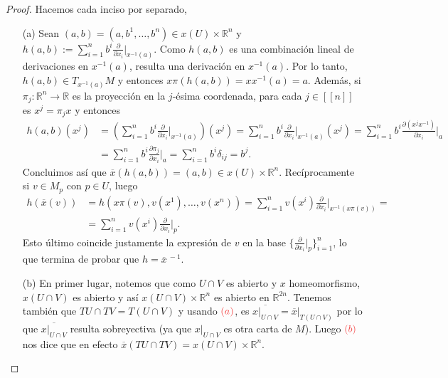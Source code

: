\documentclass[11pt]{article}
\newcommand{\R}{\mathbb{R}}
\newcommand{\nat}[1]{[\![#1]\!]}
\newcommand{\paint}[2]{\color{#1}{#2}}
\newcommand{\ol}{\overline}
\newcommand{\hook}[3]{\frac{\partial}{\partial x_{#1}}\Big\rvert_{#2}^{#3}}
\begin{document}
\begin{proof} Hacemos cada inciso por separado,
\begin{itemize}
\item[(a)] Sean $(a,b) = (a, b^1, \dots, b^n) \in x(U) \times \R^n$ y $h(a,b) := \sum_{i=1}^nb^i \frac{\partial}{\partial x_i}|_{x^{-1}(a)}$. Como $h(a,b)$ es una combinaci\'on lineal de derivaciones en $x^{-1}(a)$, resulta una derivaci\'on en $x^{-1}(a)$. Por lo tanto, $h(a,b) \in T_{x^{-1}(a)}M$ y entonces $x\pi(h(a,b)) = xx^{-1}(a) = a$. Adem\'as, si $\pi_j : \R^n \to \R$ es la proyecci\'on en la $j$-\'esima coordenada, para cada $j \in \nat{n}$ es $x^j = \pi_jx$ y entonces
\begin{align*}
h(a,b)(x^j) &= \left(\sum_{i=1}^nb^i \hook{i}{x^{-1}(a)}{} \right)(x^j) = \sum_{i=1}^nb^i \hook{i}{x^{-1}(a)}{}(x^j) = \sum_{i=1}^nb^i \frac{\partial (x^jx^{-1})}{\partial x_i}\Big|_a \\
& = \sum_{i=1}^nb^i \frac{\partial \pi_j}{\partial x_i}\Big|_a =  \sum_{i=1}^nb^i \delta_{ij} = b^j.
\end{align*}
Concluimos as\'i que $\ol{x}(h(a,b)) = (a,b) \in x(U) \times \R^n$. Rec\'iprocamente si $v \in M_p$ con $p \in U$, luego
\begin{align*}
h(\ol{x}(v)) & = h(x\pi(v),v(x^1),\dots,v(x^n)) = \sum_{i=1}^nv(x^i)\hook{i}{x^{-1}(x\pi(v))}{} = \\
& = \sum_{i=1}^nv(x^i)\hook{i}{p}{}.
\end{align*}
Esto \'ultimo coincide justamente la expresi\'on de $v$ en la base $\big\{\hook{i}{p}{}\big\}_{i=1}^n$, lo que termina de probar que $h = \ol{x}^{\ -1}$.
\item[(b)] En primer lugar, notemos que como $U \cap V$ es abierto y $x$ homeomorfismo, $x(U\cap V)$ es abierto y as\'i $x(U \cap V) \times \R^n$ es abierto en $\R^{2n}$. Tenemos tambi\'en que $TU \cap TV = T(U \cap V)$ y usando $\paint{red}{(a)}$, es $\ol{x|_{U \cap V}} = \ol{x}|_{T(U \cap V)}$ por lo que $\ol{x|_{U \cap V}}$ resulta sobreyectiva (ya que $x|_{U \cap V}$ es otra carta de $M$). Luego $\paint{red}{(b)}$ nos dice que en efecto $\ol{x}(TU \cap TV) = x(U \cap V) \times \R^n$. 


\end{itemize}
\end{proof}
\end{document}

